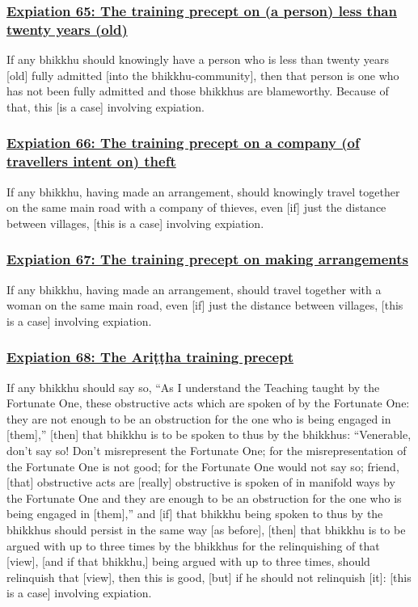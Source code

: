 \subsubsection*{\hyperref[pac65]{Expiation 65: The training precept on (a person) less than twenty years (old)}}
\label{exp65}
If any bhikkhu should knowingly have a person who is less than twenty years [old] fully admitted [into the bhikkhu-community], then that person is one who has not been fully admitted and those bhikkhus are blameworthy. Because of that, this [is a case] involving expiation.



\subsubsection*{\hyperref[pac66]{Expiation 66: The training precept on a company (of travellers intent on) theft}}
\label{exp66}
If any bhikkhu, having made an arrangement, should knowingly travel together on the same main road with a company of thieves, even [if] just the distance between villages, [this is a case] involving expiation.



\subsubsection*{\hyperref[pac67]{Expiation 67: The training precept on making arrangements}}
\label{exp67}
If any bhikkhu, having made an arrangement, should travel together with a woman on the same main road, even [if] just the distance between villages, [this is a case] involving expiation.



\subsubsection*{\hyperref[pac68]{Expiation 68: The Ariṭṭha training precept}}
\label{exp68}
If any bhikkhu should say so, ``As I understand the Teaching taught by the Fortunate One, these obstructive acts which are spoken of by the Fortunate One: they are not enough to be an obstruction for the one who is being engaged in [them],'' [then] that bhikkhu is to be spoken to thus by the bhikkhus: ``Venerable, don't say so! Don't misrepresent the Fortunate One; for the misrepresentation of the Fortunate One is not good; for the Fortunate One would not say so; friend, [that] obstructive acts are [really] obstructive is spoken of in manifold ways by the Fortunate One and they are enough to be an obstruction for the one who is being engaged in [them],'' and [if] that bhikkhu being spoken to thus by the bhikkhus should persist in the same way [as before], [then] that bhikkhu is to be argued with up to three times by the bhikkhus for the relinquishing of that [view], [and if that bhikkhu,] being argued with up to three times, should relinquish that [view], then this is good, [but] if he should not relinquish [it]: [this is a case] involving expiation.



